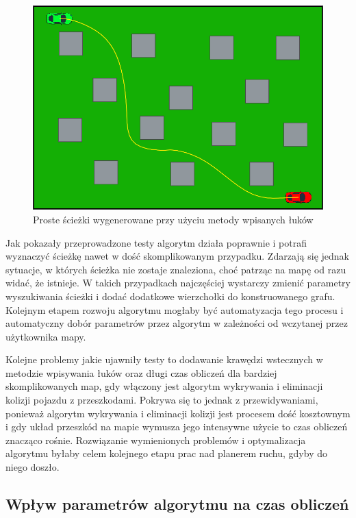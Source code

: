 \documentclass[a4paper,11pt,twoside]{report}
\theoremstyle{definition}
\begin{document}
\newpage

\begin{figure}[h!]
\centering
\includegraphics[scale=0.65]{simplePath4}
\caption[Proste ścieżki wygenerowane przy użyciu metody wpisanych łuków]{Proste ścieżki wygenerowane przy użyciu metody wpisanych łuków}
\end{figure}

Jak pokazały przeprowadzone testy algorytm działa poprawnie i potrafi wyznaczyć ścieżkę nawet w dość skomplikowanym przypadku. Zdarzają się jednak sytuacje, w których ścieżka nie zostaje znaleziona, choć patrząc na mapę od razu widać, że istnieje. W takich przypadkach najczęściej wystarczy zmienić parametry wyszukiwania ścieżki i dodać dodatkowe wierzchołki do konstruowanego grafu. Kolejnym etapem rozwoju algorytmu mogłaby być automatyzacja tego procesu i automatyczny dobór parametrów przez algorytm w zależności od wczytanej przez użytkownika mapy.

Kolejne problemy jakie ujawniły testy to dodawanie krawędzi wstecznych w metodzie wpisywania łuków oraz długi czas obliczeń dla bardziej skomplikowanych map, gdy włączony jest algorytm wykrywania i eliminacji kolizji pojazdu z przeszkodami. Pokrywa się to jednak z przewidywaniami, ponieważ algorytm wykrywania i eliminacji kolizji jest  procesem dość kosztownym i gdy układ przeszkód na mapie wymusza jego intensywne użycie to czas obliczeń znacząco rośnie. Rozwiązanie wymienionych problemów i optymalizacja algorytmu byłaby celem kolejnego etapu prac nad planerem ruchu, gdyby do niego doszło.

\newpage

\subsection{Wpływ parametrów algorytmu na czas obliczeń}
\end{document}
